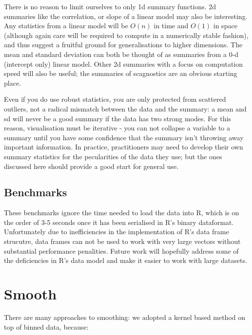 \documentclass[journal]{vgtc}                %
\begin{document}
There is no reason to limit ourselves to only 1d summary functions. 2d summaries like the correlation, or slope of a linear model may also be interesting. Any statistics from a linear model will be $O(n)$ in time and $O(1)$ in space (although again care will be required to compute in a numerically stable fashion), and thus suggest a fruitful ground for generalisations to higher dimensions.  The mean and standard deviation can both be thought of as summaries from a 0-d (intercept only) linear model. Other 2d summaries with a focus on computation speed will also be useful; the summaries of scagnostics \citep{wilkinson:2005} are an obvious starting place.

Even if you do use robust statistics, you are only protected from scattered outliers, not a radical mismatch between the data and the summary: a mean and sd will never be a good summary if the data has two strong modes. For this reason, visualisation must be iterative - you can not collapse a variable to a summary until you have some confidence that the summary isn't throwing away important information. In practice, practitioners may need to develop their own summary statistics for the pecularities of the data they use; but the ones discussed here should provide a good start for general use.

\subsection{Benchmarks}

These benchmarks ignore the time needed to load the data into R, which is on the order of 3-5 seconds once it has been serialised in R's binary dataformat.  Unfortunately due to inefficiencies in the implementation of R's data frame strucutre, data frames can not be used to work with very large vectors without substantial performance penalities. Future work will hopefully address some of the deficiencies in R's data model and make it easier to work with large datasets.

\section{Smooth}
\label{sec:smooth}


There are many approaches to smoothing: we adopted a kernel based method on top of binned data, because:
\end{document}
